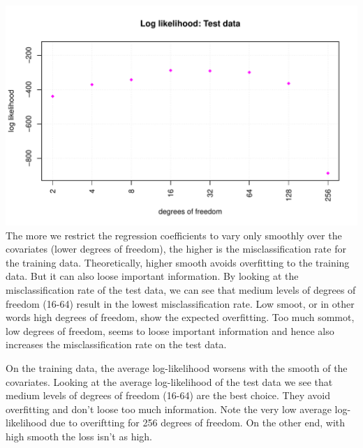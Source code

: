 \documentclass[
]{article}
\begin{document}
\includegraphics{A2_files/figure-latex/unnamed-chunk-33-4.pdf} The more
we restrict the regression coefficients to vary only smoothly over the
covariates (lower degrees of freedom), the higher is the
misclassification rate for the training data. Theoretically, higher
smooth avoids overfitting to the training data. But it can also loose
important information. By looking at the misclassification rate of the
test data, we can see that medium levels of degrees of freedom (16-64)
result in the lowest misclassification rate. Low smoot, or in other
words high degrees of freedom, show the expected overfitting. Too much
sommot, low degrees of freedom, seems to loose important information and
hence also increases the misclassification rate on the test data.

On the training data, the average log-likelihood worsens with the smooth
of the covariates. Looking at the average log-likelihood of the test
data we see that medium levels of degrees of freedom (16-64) are the
best choice. They avoid overfitting and don't loose too much
information. Note the very low average log-likelihood due to overiftting
for 256 degrees of freedom. On the other end, with high smooth the loss
isn't as high.
\end{document}
